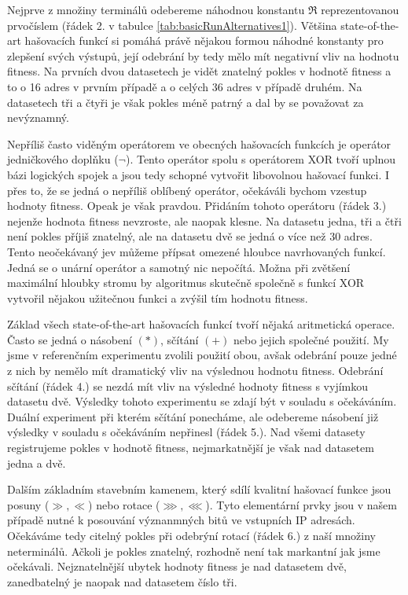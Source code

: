 Nejprve z množiny terminálů odebereme náhodnou konstantu $\Re$ reprezentovanou prvočíslem (řádek 2. v tabulce
\ref{tab:basicRunAlternatives1}).
Většina state-of-the-art
hašovacích funkcí si pomáhá právě nějakou formou náhodné konstanty pro zlepšení svých výstupů, její odebrání by tedy
mělo mít negativní vliv na hodnotu fitness. Na prvních dvou
datasetech je vidět znatelný pokles v hodnotě fitness a to o 16 adres v prvním případě a o celých 36 adres
v případě druhém. Na datasetech tři a čtyři je však pokles méně patrný a dal by se považovat za nevýznamný.

Nepříliš často viděným operátorem ve obecných hašovacích funkcích je operátor jedničkového doplňku ($\neg$).
Tento operátor
spolu s operátorem XOR tvoří uplnou bázi logických spojek a jsou tedy schopné vytvořit libovolnou hašovací funkci.
I přes to, že se jedná o nepříliš oblíbený operátor, očekáváli bychom vzestup hodnoty fitness.
Opeak je však pravdou. Přidáním tohoto operátoru (řádek 3.) nejenže hodnota fitness nevzroste, ale naopak klesne. Na datasetu
jedna, tři a čtři není pokles příjiš znatelný, ale na datasetu dvě se jedná o více než 30 adres. Tento neočekávaný jev
můžeme přípsat omezené hloubce navrhovaných funkcí. Jedná se o unární operátor a samotný nic nepočítá. Možna při 
zvětšení maximální hloubky stromu by algoritmus skutečně společně s funkcí XOR vytvořil nějakou užitečnou funkci a
zvýšil tím hodnotu fitness.

Základ všech state-of-the-art hašovacích funkcí tvoří nějaká aritmetická operace. Často
se jedná o násobení $(*)$, sčítání $(+)$ nebo jejich společné použití. My jsme v referenčním experimentu zvolili použití 
obou, avšak odebrání pouze jedné z nich by nemělo mít dramatický vliv na výslednou hodnotu fitness. Odebrání
sčítání (řádek 4.) se nezdá mít vliv na výsledné hodnoty fitness s vyjímkou datasetu dvě. Výsledky tohoto
experimentu se zdají být v souladu s očekáváním. Duální experiment při kterém sčítání ponecháme, ale odebereme
násobení již výsledky v souladu s očekáváním nepřinesl (řádek 5.). Nad všemi datasety registrujeme pokles v hodnotě
fitness, nejmarkatnější je však nad datasetem jedna a dvě.

Dalším základním stavebním kamenem, který sdílí kvalitní hašovací funkce jsou posuny ($\gg , \ll$) nebo rotace
($\ggg , \lll$). Tyto elementární prvky jsou v našem případě nutné k posouvání význanmných bitů ve vstupních IP
adresách. Očekáváme tedy citelný pokles při odebrýní rotací (řádek 6.) z naší množiny neterminálů. Ačkoli je pokles
znatelný, rozhodně není tak markantní jak jsme očekávali. Nejznatelnější ubytek hodnoty fitness je nad datasetem dvě,
zanedbatelný je naopak nad datasetem číslo tři.

